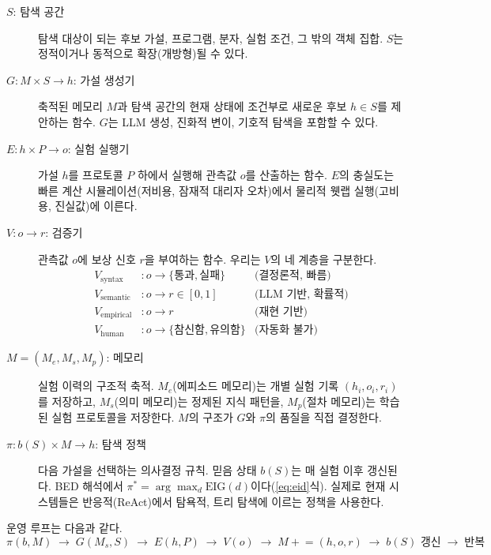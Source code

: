 \documentclass[11pt]{article}
\begin{document}
\begin{description}
  \item[$S$: 탐색 공간] 탐색 대상이 되는 후보 가설, 프로그램, 분자, 실험 조건, 그 밖의 객체 집합. $S$는 정적이거나 동적으로 확장(개방형)될 수 있다.

  \item[$G: M \times S \rightarrow h$: 가설 생성기] 축적된 메모리 $M$과 탐색 공간의 현재 상태에 조건부로 새로운 후보 $h \in S$를 제안하는 함수. $G$는 LLM 생성, 진화적 변이, 기호적 탐색을 포함할 수 있다.

  \item[$E: h \times P \rightarrow o$: 실험 실행기] 가설 $h$를 프로토콜 $P$ 하에서 실행해 관측값 $o$를 산출하는 함수. $E$의 충실도는 빠른 계산 시뮬레이션(저비용, 잠재적 대리자 오차)에서 물리적 웻랩 실행(고비용, 진실값)에 이른다.

  \item[$V: o \rightarrow r$: 검증기] 관측값 $o$에 보상 신호 $r$을 부여하는 함수. 우리는 $V$의 네 계층을 구분한다.
    \begin{align*}
      V_\text{syntax}   &: o \rightarrow \{\text{통과}, \text{실패}\} & \text{(결정론적, 빠름)}\\
      V_\text{semantic} &: o \rightarrow r \in [0,1]                  & \text{(LLM 기반, 확률적)}\\
      V_\text{empirical}&: o \rightarrow r                            & \text{(재현 기반)}\\
      V_\text{human}    &: o \rightarrow \{\text{참신함}, \text{유의함}\} & \text{(자동화 불가)}
    \end{align*}

  \item[$M = (M_e, M_s, M_p)$: 메모리] 실험 이력의 구조적 축적. $M_e$(에피소드 메모리)는 개별 실험 기록 $(h_i, o_i, r_i)$를 저장하고, $M_s$(의미 메모리)는 정제된 지식 패턴을, $M_p$(절차 메모리)는 학습된 실험 프로토콜을 저장한다. $M$의 구조가 $G$와 $\pi$의 품질을 직접 결정한다.

  \item[$\pi: b(S) \times M \rightarrow h$: 탐색 정책] 다음 가설을 선택하는 의사결정 규칙. 믿음 상태 $b(S)$는 매 실험 이후 갱신된다. BED 해석에서 $\pi^* = \arg\max_d \mathrm{EIG}(d)$이다(\ref{eq:eid}식). 실제로 현재 시스템들은 반응적(ReAct)에서 탐욕적, 트리 탐색에 이르는 정책을 사용한다.
\end{description}

\noindent 운영 루프는 다음과 같다.
\begin{equation}
  \pi(b, M) \;\rightarrow\; G(M_s, S) \;\rightarrow\; E(h, P) \;\rightarrow\; V(o) \;\rightarrow\; M \mathrel{+}= (h, o, r) \;\rightarrow\; b(S) \text{ 갱신} \;\rightarrow\; \text{반복}
\end{equation}
\end{document}
